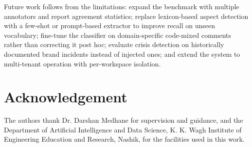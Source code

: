 \documentclass[conference]{IEEEtran}
\begin{document}
Future work follows from the limitations: expand the benchmark with multiple annotators and
report agreement statistics; replace lexicon-based aspect detection with a few-shot or
prompt-based extractor to improve recall on unseen vocabulary; fine-tune the classifier on
domain-specific code-mixed comments rather than correcting it post hoc; evaluate crisis
detection on historically documented brand incidents instead of injected ones; and extend
the system to multi-tenant operation with per-workspace isolation.

\section*{Acknowledgement}

The authors thank Dr. Darshan Medhane for supervision and guidance, and the Department of
Artificial Intelligence and Data Science, K. K. Wagh Institute of Engineering Education and
Research, Nashik, for the facilities used in this work.
\end{document}

